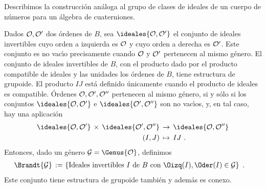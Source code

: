 Describimos la construcci\'{o}n an\'{a}loga al grupo de clases de ideales
de un cuerpo de n\'{u}meros para un \'{a}lgebra de cuaterniones.

Dados $\cal{O},\cal{O}'$ dos \'{o}rdenes de $B$, sea
$\ideales{\cal{O},\cal{O}'}$ el conjunto de ideales invertibles cuyo
orden a izquierda es $\cal{O}$ y cuyo orden a derecha es $\cal{O}'$.
Este conjunto es no vac\'{\i}o precisamente cuando $\cal{O}$ y $\cal{O}'$
pertenecen al mismo g\'{e}nero. El conjunto de ideales invertibles de $B$,
con el producto dado por el producto compatible de ideales y las
unidades los \'{o}rdenes de $B$, tiene estructura de grupoide.
El producto $IJ$ est\'{a} definido \'{u}nicamente cuando el producto de
ideales es compatible. \'{O}rdenes $\cal{O},\cal{O}',\cal{O}''$ pertenecen al
mismo g\'{e}nero, si y s\'{o}lo si los conjuntos
$\ideales{\cal{O},\cal{O}'}$ e $\ideales{\cal{O}',\cal{O}''}$ son no
vac\'{\i}os, y, en tal caso, hay una aplicaci\'{o}n
\begin{align*}
	\ideales{\cal{O},\cal{O}'}\,\times\,\ideales{\cal{O}',\cal{O}''}
	& \,\rightarrow\,\ideales{\cal{O},\cal{O}''} \\
	(I,J) & \,\mapsto\,IJ
	\text{ .}
\end{align*}
%
Entonces, dado un g\'{e}nero $\cal{G}=\Genus{\cal{O}}$, definimos
\begin{align*}
	\Brandt{\cal{G}} \,:=\, & \left\lbrace
	\text{Ideales invertibles } I\text{ de } B\text{ con }
	\Oizq(I),\Oder(I)\in\cal{G}\right\rbrace
	\text{ .}
\end{align*}
%
Este conjunto tiene estructura de grupoide tambi\'{e}n y adem\'{a}s es conexo.

